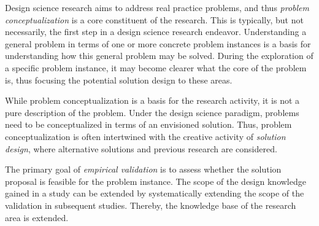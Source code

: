 \documentclass[graybox]{svmult}
\newcommand{\peggy}[1]{\textcolor{blue}{{\it [Peggy says: #1]}}}
\newcommand{\peggy}[1]{}
\begin{document}

Design science research aims to address real practice problems, and thus \emph{problem conceptualization} is a core constituent of the research. %
This is typically, but not necessarily, the first step in a design science research endeavor. Understanding a general problem in terms of one or more concrete problem instances is a basis for understanding how this general problem may be solved. During the exploration of a specific problem instance, it may become clearer what the core of the problem is, thus focusing the potential solution design to these areas. 

While problem conceptualization is a basis for the research activity, it is not a pure description of the problem. Under the design science paradigm, problems need to be conceptualized in terms of an envisioned solution. Thus, problem conceptualization is often intertwined with the creative activity of \emph{solution design}, where alternative solutions and previous research are considered. 


 The primary goal of \emph{empirical validation} is to assess whether the solution proposal is feasible for the problem instance. The scope of the design knowledge gained in a study can be extended by systematically extending the scope of the validation in subsequent studies. Thereby, the knowledge base of the research area is extended. %
\end{document}
